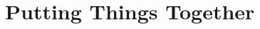 \documentclass[11pt, a4paper]{article}
\begin{document}




\section{Putting Things Together}
\end{document}
